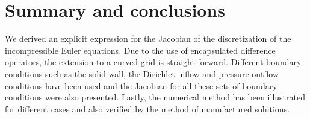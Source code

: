 \section{Summary and conclusions}
We derived an explicit expression for the Jacobian of the discretization of the incompressible Euler equations. Due to the use of encapsulated difference operators, the extension to a curved grid is straight forward. Different boundary conditions such as the solid wall, the Dirichlet inflow and pressure outflow conditions have been used and the Jacobian for all these sets of boundary conditions were also presented. Lastly, the numerical method has been illustrated for different cases and also verified by the method of manufactured solutions. 
